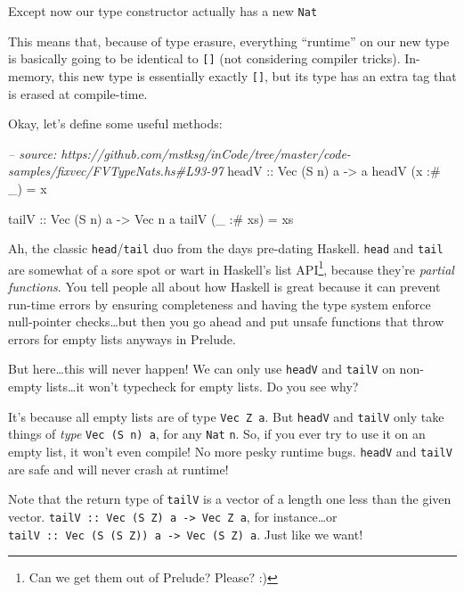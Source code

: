 \documentclass[]{article}
\newenvironment{Shaded}{\begin{snugshade}}{\end{snugshade}}
\newcommand{\CommentTok}[1]{\textcolor[rgb]{0.56,0.35,0.01}{\textit{#1}}}
\newcommand{\DataTypeTok}[1]{\textcolor[rgb]{0.13,0.29,0.53}{#1}}
\newcommand{\FunctionTok}[1]{\textcolor[rgb]{0.00,0.00,0.00}{#1}}
\newcommand{\NormalTok}[1]{#1}
\newcommand{\OtherTok}[1]{\textcolor[rgb]{0.56,0.35,0.01}{#1}}
\begin{document}
Except now our type constructor actually has a new \texttt{Nat}

This means that, because of type erasure, everything ``runtime'' on our new type
is basically going to be identical to \texttt{{[}{]}} (not considering compiler
tricks). In-memory, this new type is essentially exactly \texttt{{[}{]}}, but
its type has an extra tag that is erased at compile-time.

Okay, let's define some useful methods:

\begin{Shaded}
\begin{Highlighting}[]
\CommentTok{-- source: https://github.com/mstksg/inCode/tree/master/code-samples/fixvec/FVTypeNats.hs#L93-97}
\OtherTok{headV ::} \DataTypeTok{Vec}\NormalTok{ (}\DataTypeTok{S}\NormalTok{ n) a }\OtherTok{->}\NormalTok{ a}
\NormalTok{headV (x }\FunctionTok{:#}\NormalTok{ _)  }\FunctionTok{=}\NormalTok{ x}

\OtherTok{tailV ::} \DataTypeTok{Vec}\NormalTok{ (}\DataTypeTok{S}\NormalTok{ n) a }\OtherTok{->} \DataTypeTok{Vec}\NormalTok{ n a}
\NormalTok{tailV (_ }\FunctionTok{:#}\NormalTok{ xs) }\FunctionTok{=}\NormalTok{ xs}
\end{Highlighting}
\end{Shaded}

Ah, the classic \texttt{head}/\texttt{tail} duo from the days pre-dating
Haskell. \texttt{head} and \texttt{tail} are somewhat of a sore spot or wart in
Haskell's list API\footnote{Can we get them out of Prelude? Please? :)}, because
they're \emph{partial functions}. You tell people all about how Haskell is great
because it can prevent run-time errors by ensuring completeness and having the
type system enforce null-pointer checks\ldots{}but then you go ahead and put
unsafe functions that throw errors for empty lists anyways in Prelude.

But here\ldots{}this will never happen! We can only use \texttt{headV} and
\texttt{tailV} on non-empty lists\ldots{}it won't typecheck for empty lists. Do
you see why?

It's because all empty lists are of type \texttt{Vec\ Z\ a}. But \texttt{headV}
and \texttt{tailV} only take things of \emph{type} \texttt{Vec\ (S\ n)\ a}, for
any \texttt{Nat} \texttt{n}. So, if you ever try to use it on an empty list, it
won't even compile! No more pesky runtime bugs. \texttt{headV} and
\texttt{tailV} are safe and will never crash at runtime!

Note that the return type of \texttt{tailV} is a vector of a length one less
than the given vector.
\texttt{tailV\ ::\ Vec\ (S\ Z)\ a\ -\textgreater{}\ Vec\ Z\ a}, for
instance\ldots{}or
\texttt{tailV\ ::\ Vec\ (S\ (S\ Z))\ a\ -\textgreater{}\ Vec\ (S\ Z)\ a}. Just
like we want!
\end{document}
